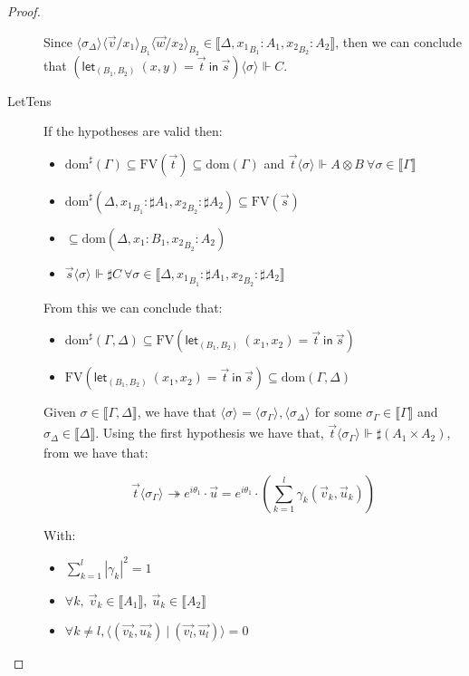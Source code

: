\documentclass[runningheads,orivec]{llncs}
\newcommand\ansubst[2]{\ensuremath{\langle #1 \rangle_{#2}}}
\newcommand\dom[1]{\mathrm{dom}(#1)}
\newcommand\sdom[1]{\mathrm{dom}^{\sharp}(#1)}
\newcommand\FV[1]{\mathrm{FV}(#1)}
\def\scal#1#2{\langle{#1}~|~{#2}\rangle}
\def\Pair#1#2{(#1,#2)} %
\def\letkeyword{\mathsf{let}}
\def\inkeyword{\mathsf{in}}
\def\LetP#1#2#3#4#5#6{\letkeyword_{\Pair{#2}{#4}}~\Pair{#1}{#3}=#5~\inkeyword~#6}
\def\eval{\twoheadrightarrow}
\def\sem#1{\llbracket#1\rrbracket}
\def\real{\Vdash}
\begin{document}
\begin{proof}
\begin{description}
    Since $\ansubst{\sigma_\Delta}{}\ansubst{\vec{v}/x_1}{B_1}\ansubst{\vec{w}/x_2}{B_2}\in\sem{\Delta,{x_1}_{B_1}:A_1,{x_2}_{B_2}:A_2}$, then we can conclude that $(\LetP{x}{B_1}{y}{B_2}{\vec{t}}{\vec{s}})\ansubst{\sigma}{}\real C$.

    \item[LetTens] If the hypotheses are valid then:
    \begin{itemize}
        \item $\sdom{\Gamma}\subseteq \FV{\vec t} \subseteq \dom{\Gamma}$ and $\vec t \ansubst{\sigma}{}\Vdash A\otimes B\ \forall \sigma\in\sem\Gamma$
        \item $\sdom{\Delta, {x_1}_{B_1}:\sharp A_1, {x_2}_{B_2}:\sharp A_2}\subseteq \FV{\vec s}$
        \item $\subseteq \dom{\Delta,{x_1}:{B_1}, {x_2}_{B_2}:A_2}$
        \item $\vec s \ansubst{\sigma}{}\Vdash \sharp C\ \forall \sigma\in\sem{\Delta, {x_1}_{B_1}:\sharp A_1, {x_2}_{B_2}:\sharp A_2}$
    \end{itemize}
    
    From this we can conclude that:
    \begin{itemize}
        \item $\sdom{\Gamma,\Delta}\subseteq\FV{\LetP{x_1}{B_1}{x_2}{B_2}{\vec{t}}{\vec{s}}}$
        \item $\FV{\LetP{x_1}{B_1}{x_2}{B_2}{\vec{t}}{\vec{s}}}\subseteq\dom{\Gamma,\Delta}$
    \end{itemize}
    
    Given $\sigma\in\sem{\Gamma,\Delta}$, we have that $\ansubst{\sigma}{}=\ansubst{\sigma_\Gamma}{},\ansubst{\sigma_\Delta}{}$ for some $\sigma_\Gamma\in\sem\Gamma$ and $\sigma_\Delta\in\sem\Delta$. Using the first hypothesis we have that, $\vec t\ansubst{\sigma_\Gamma}{}\real \sharp(A_1\times A_2)$, from  we have that:
    
    \[\vec t\ansubst{\sigma_\Gamma}{}\eval e^{i\theta_1}\cdot\vec{u}=e^{i\theta_1}\cdot(\sum_{k=1}^{l} \gamma_k \Pair{\vec v_k}{\vec u_k})\] 
    
    With:
    \begin{itemize}
        \item $\sum_{k=1}^{l} |\gamma_k|^2 = 1$
        \item $\forall k,\ \vec v_k\in\sem{A_1},\ \vec u_k\in\sem{A_2}$
        \item $\forall k\neq l, \scal{\Pair{\vec{v_k}}{\vec{u_k}}}{\Pair{\vec{v_l}}{\vec{u_l}}}= 0$
    \end{itemize}
    

\end{description}
\end{proof}
\end{document}
